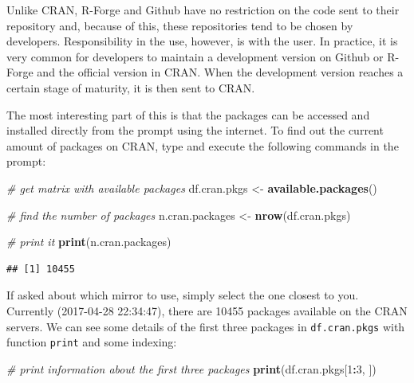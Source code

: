 \documentclass[11pt,]{book}
\newenvironment{Shaded}{\begin{snugshade}}{\end{snugshade}}
\newcommand{\KeywordTok}[1]{\textcolor[rgb]{0.27,0.27,0.27}{\textbf{#1}}}
\newcommand{\DecValTok}[1]{\textcolor[rgb]{0.06,0.06,0.06}{#1}}
\newcommand{\StringTok}[1]{\textcolor[rgb]{0.5,0.5,0.5}{#1}}
\newcommand{\CommentTok}[1]{\textcolor[rgb]{0.56,0.35,0.01}{\textit{#1}}}
\newcommand{\OperatorTok}[1]{\textcolor[rgb]{0.81,0.36,0.00}{\textbf{#1}}}
\newcommand{\NormalTok}[1]{#1}
\begin{document}
Unlike CRAN, R-Forge and Github have no restriction on the code sent to
their repository and, because of this, these repositories tend to be
chosen by developers. Responsibility in the use, however, is with the
user. In practice, it is very common for developers to maintain a
development version on Github or R-Forge and the official version in
CRAN. When the development version reaches a certain stage of maturity,
it is then sent to CRAN.

The most interesting part of this is that the packages can be accessed
and installed directly from the prompt using the internet. To find out
the current amount of packages on CRAN, type and execute the following
commands in the prompt:

\begin{Shaded}
\begin{Highlighting}[]
\CommentTok{# get matrix with available packages}
\NormalTok{df.cran.pkgs <-}\StringTok{ }\KeywordTok{available.packages}\NormalTok{()}

\CommentTok{# find the number of packages}
\NormalTok{n.cran.packages <-}\StringTok{ }\KeywordTok{nrow}\NormalTok{(df.cran.pkgs)}

\CommentTok{# print it}
\KeywordTok{print}\NormalTok{(n.cran.packages)}
\end{Highlighting}
\end{Shaded}

\begin{verbatim}
## [1] 10455
\end{verbatim}

If asked about which mirror to use, simply select the one closest to
you. Currently (2017-04-28 22:34:47), there are 10455 packages available
on the CRAN servers. We can see some details of the first three packages
in \texttt{df.cran.pkgs} with function \texttt{print} and some indexing:

\begin{Shaded}
\begin{Highlighting}[]
\CommentTok{# print information about the first three packages}
\KeywordTok{print}\NormalTok{(df.cran.pkgs[}\DecValTok{1}\OperatorTok{:}\DecValTok{3}\NormalTok{, ])}
\end{Highlighting}
\end{Shaded}
\end{document}
